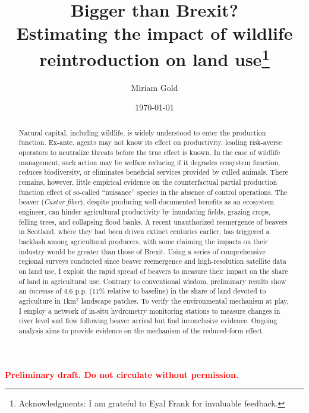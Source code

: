 \documentclass[11pt, english, letterpaper]{article}
\begin{document}
\justifying


\vspace{-2em} 

\title{Bigger than Brexit? \\ Estimating the impact of wildlife reintroduction on land use\thanks{Acknowledgments: I am grateful to Eyal Frank for invaluable feedback.}}
\author[1]{\small Miriam Gold}

\date{\today}
\maketitle

\begin{center}
\vspace{-3em}
\textbf{\textcolor{red}{Preliminary draft. Do not circulate without permission.}}
\end{center}

\begin{abstract}
    \singlespacing 
    Natural capital, including wildlife, is widely understood to enter the production function. Ex-ante, agents may not know its effect on productivity, leading risk-averse operators to neutralize threats before the true effect is known. In the case of wildlife management, such action may be welfare reducing if it degrades ecosystem function, reduces biodiversity, or eliminates beneficial services provided by culled animals. There remains, however, little empirical evidence on the counterfactual partial production function effect of so-called ``nuisance'' species in the absence of control operations. The beaver (\textit{Castor fiber}), despite producing well-documented benefits as an ecosystem engineer, can hinder agricultural productivity by inundating fields, grazing crops, felling trees, and collapsing flood banks. A recent unauthorized reemergence of beavers in Scotland, where they had been driven extinct centuries earlier, has triggered a backlash among agricultural producers, with some claiming the impacts on their industry would be greater than those of Brexit. Using a series of comprehensive regional surveys conducted since beaver reemergence and high-resolution satellite data on land use, I exploit the rapid spread of beavers to measure their impact on the share of land in agricultural use. Contrary to conventional wisdom, preliminary results show an \textit{increase} of 4.6 p.p. (11\% relative to baseline) in the share of land devoted to agriculture in 1km$^2$ landscape patches. To verify the environmental mechanism at play, I employ a network of in-situ hydrometry monitoring stations to measure changes in river level and flow following beaver arrival but find inconclusive evidence. Ongoing analysis aims to provide evidence on the mechanism of the reduced-form effect.
\end{abstract}
\end{document}
